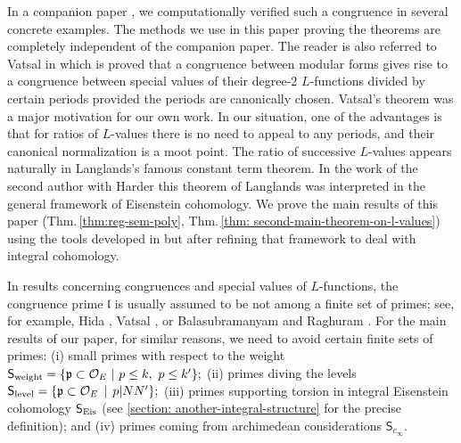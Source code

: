 \documentclass[11pt]{amsart}
\begin{document}
\smallskip

In a companion paper \cite{narayanan-raghuram}, we computationally verified such a congruence in several concrete examples. The methods we use 
in this paper proving the theorems are completely independent of the companion paper. 
The reader is also referred to Vatsal \cite{vatsal} in which is proved that a congruence between modular forms gives rise to a 
congruence between special values of their degree-$2$ $L$-functions divided by certain periods provided the periods are canonically chosen. 
Vatsal's theorem was a major motivation for our own work. In our situation, one of the advantages is that for ratios of $L$-values 
there is no need to appeal to any periods, and their canonical normalization is a moot point. 
The ratio of successive $L$-values appears naturally in Langlands's famous constant term theorem. 
In the work of the second author with Harder \cite{harder-raghuram} 
this theorem of Langlands was interpreted in the general framework of Eisenstein cohomology. 
We prove the main results of this paper (Thm.\,\ref{thm:reg-sem-poly}, Thm.\,\ref{thm: second-main-theorem-on-l-values}) 
using the tools developed in \cite{harder-raghuram} but after refining that framework to deal with integral cohomology.

\smallskip 

In results concerning congruences and special values of $L$-functions, the congruence prime $\mathfrak{l}$ is usually assumed to be not among a finite set of primes; 
see, for example, Hida \cite{h81a}, Vatsal \cite{vatsal}, or Balasubramanyam and Raghuram \cite{balasubramanyam-raghuram}.  
For the main results of our paper, for similar reasons, we need to avoid certain finite sets of primes: (i) 
small primes with respect to the weight $\mathsf{S}_{\textup{weight}}= \{ \mathfrak{p} \subset \mathcal{O}_E \ | \ p\leq k, \ p \leq k'\};$ 
(ii) primes diving the levels $\mathsf{S}_{\textup{level}} = \{ \mathfrak{p} \subset \mathcal{O}_E \:\: |\:\: p| NN'\};$
(iii) primes supporting torsion in integral Eisenstein cohomology $\mathsf{S}_{\textup{Eis}}$ (see \ref{section: another-integral-structure} for the precise definition); 
and (iv) primes coming from archimedean considerations $\mathsf{S}_{c_{\infty}}.$ 

\smallskip
\end{document}
